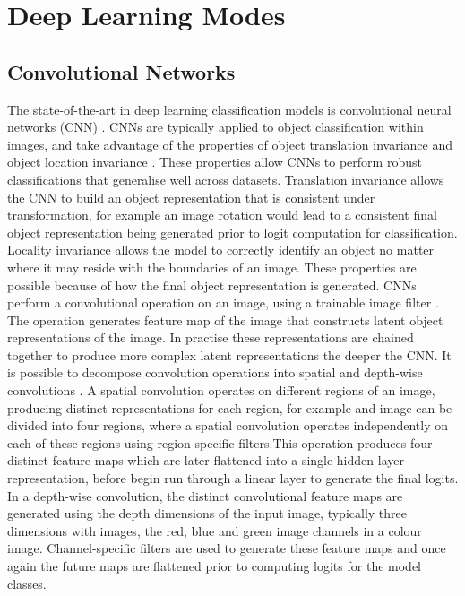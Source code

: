 \section{Deep Learning Modes}

\subsection{Convolutional Networks}
The state-of-the-art in deep learning classification models is convolutional neural networks (CNN) \citet{reference}. CNNs are typically applied to object classification within images, and take advantage of the properties of object translation invariance and object location invariance \cite{reference}. These properties allow CNNs to perform robust classifications that generalise well across datasets. Translation invariance allows the CNN to build an object representation that is consistent under transformation, for example an image rotation would lead to a consistent final object representation being generated prior to logit computation for classification. Locality invariance allows the model to correctly identify an object no matter where it may reside with the boundaries of an image. \newline
These properties are possible because of how the final object representation is generated. CNNs perform a convolutional operation on an image, using a trainable image filter \cite{reference}. The operation generates feature map of the image that constructs latent object representations of the image. In practise these representations are chained together to produce more complex latent representations the deeper the CNN. \newline
It is possible to decompose convolution operations into spatial and depth-wise convolutions \cite{reference}. A spatial convolution operates on different regions of an image, producing distinct representations for each region, for example and image can be divided into four regions, where a spatial convolution operates independently on each of these regions using region-specific filters.This operation produces four distinct feature maps which are later flattened into a single hidden layer representation, before begin run through a linear layer to generate the final logits. In a depth-wise convolution, the distinct convolutional feature maps are generated using the depth dimensions of the input image, typically three dimensions with images, the red, blue and green image channels in a colour image. Channel-specific filters are used to generate these feature maps and once again the future maps are flattened prior to computing logits for the model classes. \newline
